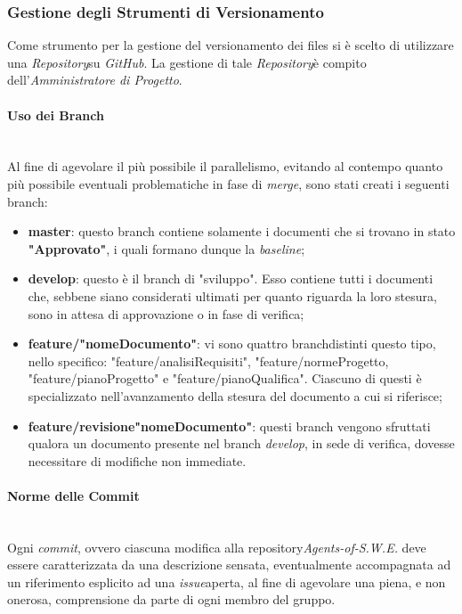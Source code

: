 \subsubsection{Gestione degli Strumenti di Versionamento}
	Come strumento per la gestione del versionamento dei files si è scelto di utilizzare una \textit{Repository}\glossario su \textit{GitHub}\glossario. La gestione di tale \textit{Repository}\glossario è compito dell'\textit{Amministratore di Progetto}.

\paragraph{Uso dei Branch} ~\\
	Al fine di agevolare il più possibile il parallelismo, evitando al contempo quanto più possibile eventuali problematiche in fase di \textit{merge}\glossario, sono stati creati i seguenti branch\glossario:
	\begin{itemize}
	\item \textbf{master}: questo branch contiene solamente i documenti che si trovano in stato \textbf{"Approvato"}, i quali formano dunque la \textit{baseline}\glossario;
	\item \textbf{develop}: questo è il branch di "sviluppo". Esso contiene tutti i documenti che, sebbene siano considerati ultimati per quanto riguarda la loro stesura, sono in attesa di approvazione o in fase di verifica;
	\item \textbf{feature/"nomeDocumento"}: vi sono quattro branch\glossario distinti questo tipo, nello specifico: "feature/analisiRequisiti", "feature/normeProgetto, "feature/pianoProgetto" e "feature/pianoQualifica". Ciascuno di questi è specializzato nell'avanzamento della stesura del documento a cui si riferisce;
	\item \textbf{feature/revisione"nomeDocumento"}: questi branch vengono sfruttati qualora un documento presente nel branch \textit{develop}, in sede di verifica, dovesse necessitare di modifiche non immediate.
	\end{itemize}

\paragraph{Norme delle Commit} ~\\
	Ogni \textit{commit}\glossario, ovvero ciascuna modifica alla repository\glossario \textit{Agents-of-S.W.E.} deve essere caratterizzata da una descrizione sensata, eventualmente accompagnata ad un riferimento esplicito ad una \textit{issue}\glossario aperta, al fine di agevolare una piena, e non onerosa, comprensione da parte di ogni membro del gruppo.

